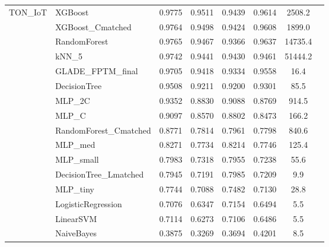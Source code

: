 \documentclass[journal,10pt]{IEEEtran}
\begin{document}
\begin{longtable}{llcccccr}
\multirow{16}{*}{TON\_IoT}
 & XGBoost                & 0.9775 & 0.9511 & 0.9439 & 0.9614 & 2508.2   \\
 & XGBoost\_Cmatched      & 0.9764 & 0.9498 & 0.9424 & 0.9608 & 1899.0   \\
 & RandomForest           & 0.9765 & 0.9467 & 0.9366 & 0.9637 & 14735.4  \\
 & kNN\_5                 & 0.9742 & 0.9441 & 0.9430 & 0.9461 & 51444.2  \\
 & GLADE\_FPTM\_final     & 0.9705 & 0.9418 & 0.9334 & 0.9558 & 16.4     \\
 & DecisionTree           & 0.9508 & 0.9211 & 0.9200 & 0.9301 & 85.5     \\
 & MLP\_2C                & 0.9352 & 0.8830 & 0.9088 & 0.8769 & 914.5    \\
 & MLP\_C                 & 0.9097 & 0.8570 & 0.8802 & 0.8473 & 166.2    \\
 & RandomForest\_Cmatched & 0.8771 & 0.7814 & 0.7961 & 0.7798 & 840.6    \\
 & MLP\_med               & 0.8271 & 0.7734 & 0.8214 & 0.7746 & 125.4    \\
 & MLP\_small             & 0.7983 & 0.7318 & 0.7955 & 0.7238 & 55.6     \\
 & DecisionTree\_Lmatched & 0.7945 & 0.7191 & 0.7985 & 0.7209 & 9.9      \\
 & MLP\_tiny              & 0.7744 & 0.7088 & 0.7482 & 0.7130 & 28.8     \\
 & LogisticRegression     & 0.7076 & 0.6347 & 0.7154 & 0.6494 & 5.5      \\
 & LinearSVM              & 0.7114 & 0.6273 & 0.7106 & 0.6486 & 5.5      \\
 & NaiveBayes             & 0.3875 & 0.3269 & 0.3694 & 0.4201 & 8.5      \\
\midrule


\end{longtable}
\end{document}
